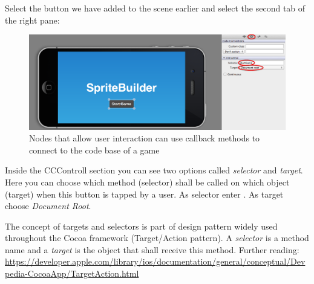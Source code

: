 \begin{leftbar}
Select the button we have added to the scene earlier and
select the second tab of the right pane:

\begin{figure}[H]
		\centering
		\includegraphics[width=0.9\linewidth]{images/firstproject/button_callback.png}
		\caption{Nodes that allow user interaction can use callback methods to
		connect to the code base of a game}
\end{figure}

Inside the CCControll section you can see two options called \textit{selector}
and \textit{target}. Here you can choose which method (selector) shall be
called on which object (target) when this button is tapped by a user. As
selector enter . As target choose \textit{Document Root}.
\end{leftbar}

\begin{details} \label{target_selector}
The concept of targets and selectors is part of design pattern widely used
throughout the Cocoa framework (Target/Action pattern). A \textit{selector} is
a method name and a \textit{target} is the object that shall receive this method.
Further reading:
\url{https://developer.apple.com/library/ios/documentation/general/conceptual/Devpedia-CocoaApp/TargetAction.html}
\end{details}

